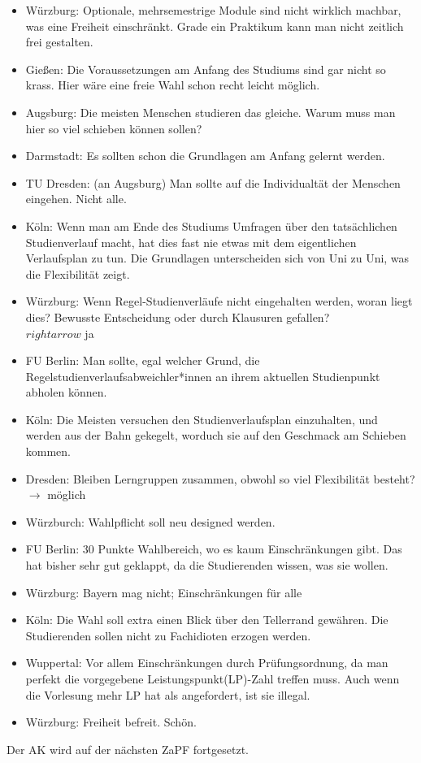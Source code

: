 \begin{itemize}
      \item Würzburg: Optionale, mehrsemestrige Module sind nicht wirklich machbar, was eine Freiheit einschränkt. Grade ein Praktikum kann man nicht zeitlich frei gestalten.
      \item Gießen: Die Voraussetzungen am Anfang des Studiums sind gar nicht so krass. Hier wäre eine freie Wahl schon recht leicht möglich.
      \item Augsburg: Die meisten Menschen studieren das gleiche. Warum muss man hier so viel schieben können sollen?
      \item Darmstadt: Es sollten schon die Grundlagen am Anfang gelernt werden.
      \item TU Dresden: (an Augsburg) Man sollte auf die Individualtät der Menschen eingehen. Nicht alle.
      \item Köln: Wenn man am Ende des Studiums Umfragen über den tatsächlichen Studienverlauf macht, hat dies fast nie etwas mit dem eigentlichen Verlaufsplan zu tun.
            Die Grundlagen unterscheiden sich von Uni zu Uni, was die Flexibilität zeigt.
      \item Würzburg: Wenn Regel-Studienverläufe nicht eingehalten werden, woran liegt dies? Bewusste Entscheidung oder durch Klausuren gefallen? \\ $rightarrow$ ja
      \item FU Berlin: Man sollte, egal welcher Grund, die Regelstudienverlaufsabweichler*innen an ihrem aktuellen Studienpunkt abholen können.
      \item Köln: Die Meisten versuchen den Studienverlaufsplan einzuhalten, und werden aus der Bahn gekegelt, worduch sie auf den Geschmack am Schieben kommen.
      \item Dresden: Bleiben Lerngruppen zusammen, obwohl so viel Flexibilität besteht? $\rightarrow$ möglich
      \item Würzburch: Wahlpflicht soll neu designed werden.
      \item FU Berlin: 30 Punkte Wahlbereich, wo es kaum Einschränkungen gibt. Das hat bisher sehr gut geklappt, da die Studierenden wissen, was sie wollen.
      \item Würzburg: Bayern mag nicht; Einschränkungen für alle
      \item Köln: Die Wahl soll extra einen Blick über den Tellerrand gewähren. Die Studierenden sollen nicht zu Fachidioten erzogen werden.
      \item Wuppertal: Vor allem Einschränkungen durch Prüfungsordnung, da man perfekt die vorgegebene Leistungspunkt(LP)-Zahl treffen muss. Auch wenn die Vorlesung mehr LP hat als angefordert, ist sie illegal.
      \item Würzburg: Freiheit befreit. Schön.
    \end{itemize}

    Der AK wird auf der nächsten ZaPF fortgesetzt.
